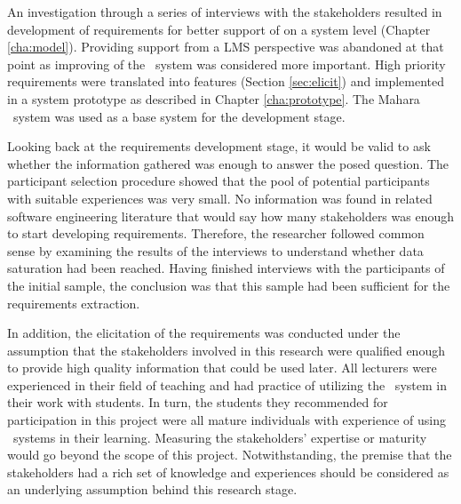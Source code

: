 \vspace{2 mm}


\vspace{2 mm}

An investigation through a series of interviews with the stakeholders resulted
in development of requirements for better support of \LLLs on a system level
(Chapter \ref{cha:model}). Providing support from a LMS perspective was
abandoned at that point as improving of the \ep~system was considered more
important. High priority requirements were translated into features (Section
\ref{sec:elicit}) and implemented in a system prototype as described in Chapter
\ref{cha:prototype}. The Mahara \ep~system was used as a base system for the
development stage.

\vspace{2 mm}

Looking back at the requirements development stage, it would be valid to ask
whether the information gathered was enough to answer the posed question.
The participant selection procedure showed that the pool of potential
participants with suitable experiences was very small. No information was found
in related software engineering literature that would say how many stakeholders
was enough to start developing requirements. Therefore, the researcher followed
common sense by examining the results of the interviews to understand whether
data saturation had been reached. Having finished interviews with the
participants of the initial sample, the conclusion was that this sample had been
sufficient for the requirements extraction.

\vspace{2 mm}

In addition, the elicitation of the requirements was conducted under the
assumption that the stakeholders involved in this research were qualified enough
to provide high quality information that could be used later. All lecturers were
experienced in their field of teaching and had practice of utilizing the
\ep~system in their work with students. In turn, the students they recommended
for participation in this project were all mature individuals with experience of
using \ep~systems in their learning. Measuring the stakeholders' expertise or
maturity would go beyond the scope of this project. Notwithstanding, the premise
that the stakeholders had a rich set of knowledge and experiences should be
considered as an underlying assumption behind this research stage.

